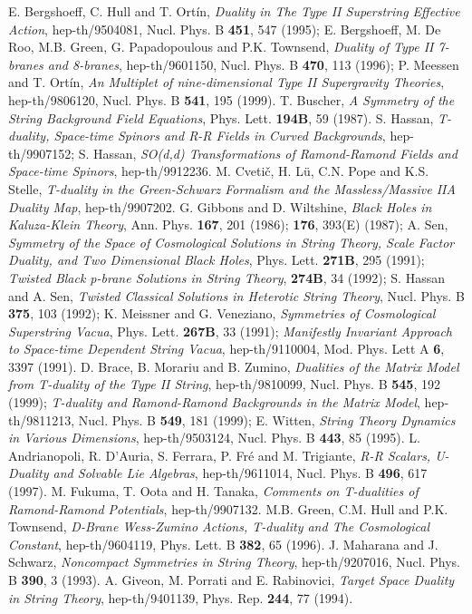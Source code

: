 \documentclass[a4paper,12pt]{article}
\begin{document}
\begin{thebibliography}{d1}
 E. Bergshoeff, C. Hull and T. Ort\'in,
{\it Duality in The Type II Superstring Effective Action}, 
hep-th/9504081, Nucl. Phys. B {\bf 451}, 547 (1995);
E. Bergshoeff, M. De Roo,
M.B. Green, G. Papadopoulous and P.K. Townsend,
{\it Duality of Type II 7-branes and 8-branes},
hep-th/9601150, Nucl. Phys. B {\bf 470}, 113 (1996);
P. Meessen and T. Ort\'{i}n,
{\it An \coordHE{} Multiplet of nine-dimensional 
Type II Supergravity Theories}, 
hep-th/9806120, Nucl. Phys. B {\bf 541}, 195 (1999).
 T. Buscher, {\it A Symmetry of the
String Background Field Equations},
Phys. Lett. {\bf 194B}, 59 (1987).
 S. Hassan, {\it T-duality, Space-time Spinors
and R-R Fields in Curved Backgrounds}, hep-th/9907152;
S. Hassan, {\it SO(d,d) Transformations
of Ramond-Ramond Fields and Space-time Spinors}, hep-th/9912236.
 M. Cveti\v c, H. L\"u, C.N. Pope and K.S. Stelle,
{\it T-duality in the Green-Schwarz Formalism 
and the Massless/Massive IIA Duality Map}, hep-th/9907202.
 G. Gibbons and D. Wiltshine, 
{\it Black Holes in Kaluza-Klein Theory}, Ann. Phys. {\bf 167},
201 (1986); {\bf 176}, 393(E) (1987);
A. Sen, {\it {}\coordHE{} Symmetry of the Space
of Cosmological Solutions in String Theory, Scale
Factor Duality, and Two Dimensional Black Holes},
Phys. Lett. {\bf 271B}, 295 (1991);
{\it Twisted Black p-brane Solutions in String Theory},
{\bf 274B}, 34 (1992);
S. Hassan and A. Sen, {\it Twisted Classical Solutions
in Heterotic String Theory},
Nucl. Phys. B {\bf 375}, 103 (1992);
K. Meissner and G. Veneziano, 
{\it Symmetries of Cosmological Superstring Vacua},
Phys. Lett. {\bf 267B}, 33 (1991);
{\it Manifestly \coordHE{} Invariant Approach to Space-time
Dependent String Vacua},
hep-th/9110004, Mod. Phys. Lett A {\bf 6}, 3397 (1991).
 D. Brace, B. Morariu and B. Zumino,
{\it Dualities of the Matrix Model from T-duality of the 
Type II String}, hep-th/9810099,
Nucl. Phys. B {\bf 545}, 192 (1999); 
{\it T-duality and Ramond-Ramond Backgrounds in the Matrix Model},
hep-th/9811213, Nucl. Phys. B {\bf 549}, 181 (1999);
E. Witten, {\it String Theory Dynamics in Various Dimensions},
hep-th/9503124, Nucl. Phys. B {\bf 443}, 85 (1995).
L. Andrianopoli, R. D'Auria, S. Ferrara, P. Fr\'e
and M. Trigiante, {\it R-R Scalars, U-Duality
and Solvable Lie Algebras}, hep-th/9611014,
Nucl. Phys. B {\bf 496}, 617 (1997).
 M. Fukuma, T. Oota and H. Tanaka,
{\it Comments on T-dualities of Ramond-Ramond Potentials},
hep-th/9907132.
 M.B. Green, C.M. Hull and P.K. Townsend,
{\it D-Brane Wess-Zumino Actions, T-duality and The Cosmological
Constant}, hep-th/9604119, Phys. Lett. B {\bf 382}, 65 (1996).
 J. Maharana and J. Schwarz, 
{\it Noncompact Symmetries in String Theory}, hep-th/9207016,
Nucl. Phys. B {\bf 390}, 3 (1993).
 A. Giveon, M. Porrati and E. Rabinovici, 
{\it Target Space Duality in String Theory},
hep-th/9401139, Phys. Rep. {\bf 244}, 77 (1994).
\end{thebibliography}  
\end{document}
